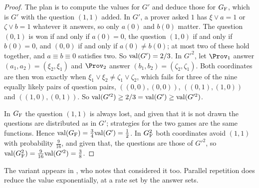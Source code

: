 \begin{refsection}

\begin{proof}
The plan is to compute the values for $G'$ and deduce those for $G_{\mathrm{F}}$, which is $G'$ with the question $(1,1)$ added. In $G'$, a prover asked $1$ has $\xi\vee a=1$ or $\zeta\vee b=1$ whatever it answers, so only $a(0)$ and $b(0)$ matter. The question $(0,1)$ is won if and only if $a(0)=0$, the question $(1,0)$ if and only if $b(0)=0$, and $(0,0)$ if and only if $a(0)\ne b(0)$; at most two of these hold together, and $a\equiv b\equiv0$ satisfies two. So $\mathrm{val}(G')=2/3$. In $G'^2$, let $\Prov_1$ answer $(a_1,a_2)=(\xi_2,\xi_1)$ and $\Prov_2$ answer $(b_1,b_2)=(\zeta_2,\zeta_1)$. Both coordinates are then won exactly when $\xi_1\vee\xi_2\ne\zeta_1\vee\zeta_2$, which fails for three of the nine equally likely pairs of question pairs, $((0,0),(0,0))$, $((0,1),(1,0))$ and $((1,0),(0,1))$. So $\mathrm{val}(G'^2)\ge2/3=\mathrm{val}(G')\ge\mathrm{val}(G'^2)$.

In $G_{\mathrm{F}}$ the question $(1,1)$ is always lost, and given that it is not drawn the questions are distributed as in $G'$; strategies for the two games are the same functions. Hence $\mathrm{val}(G_{\mathrm{F}})=\frac34\mathrm{val}(G')=\frac12$. In $G_{\mathrm{F}}^2$ both coordinates avoid $(1,1)$ with probability $\frac9{16}$, and given that, the questions are those of $G'^2$, so $\mathrm{val}(G_{\mathrm{F}}^2)=\frac9{16}\mathrm{val}(G'^2)=\frac38$.
\end{proof}

The variant appears in \textcite[Section~10.1]{Holenstein2009}, who notes that \textcite{FeigeLovasz1992} considered it too. Parallel repetition does reduce the value exponentially, at a rate set by the answer sets.


\end{refsection}
